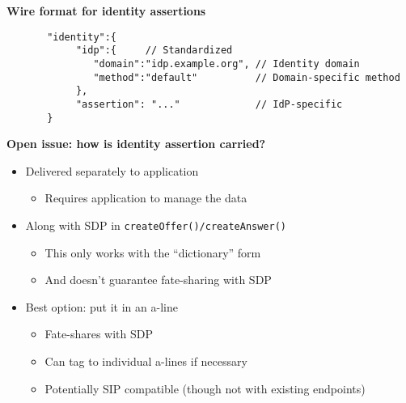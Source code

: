 \documentclass[helvetica]{seminar}
\newcommand{\heading}[1]{%
  \begin{center} 
    \large\bf 
    #1 
  \end{center} 
  \vspace{.4 in}}
\begin{document}
\begin{slide}
\heading{Wire format for identity assertions}

\begin{small}
\begin{verbatim}
       "identity":{
            "idp":{     // Standardized
               "domain":"idp.example.org", // Identity domain
               "method":"default"          // Domain-specific method
            },
            "assertion": "..."             // IdP-specific
       }
\end{verbatim}
\end{small}
\end{slide}


\begin{slide}
\heading{Open issue: how is identity assertion carried?}

\begin{itemize}
\item Delivered separately to application
  \begin{itemize}
  \item Requires application to manage the data
  \end{itemize}

\item Along with SDP in \verb^createOffer()/createAnswer()^
  \begin{itemize}
  \item This only works with the ``dictionary'' form
  \item And doesn't guarantee fate-sharing with SDP
  \end{itemize}

\item Best option: put it in an a-line
  \begin{itemize}
  \item Fate-shares with SDP
  \item Can tag to individual a-lines if necessary
  \item Potentially SIP compatible (though not with existing endpoints)
  \end{itemize}
\end{itemize}
\end{slide}
\end{document}
